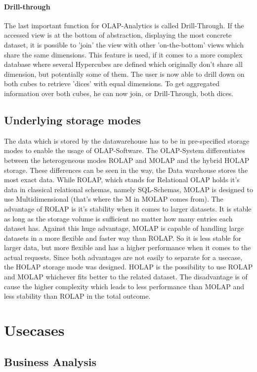 \documentclass[12pt,a4paper,oneside, 
liststotoc, 					%
bibtotoc,						%
titlepage, 						%
headsepline, 					%
BCOR6mm,						%
openany,							%
]{scrreprt}
\begin{document}
\subsubsection{Drill-through}\label{drill}
The last important function for OLAP-Analytics is called Drill-Through. If the accessed view is at the bottom of abstraction, displaying the most concrete dataset, it is possible to 'join' the view with other 'on-the-bottom' views which share the same dimensions. This feature is used, if it comes to a more complex database where several Hypercubes are defined which originally don't share all dimension, but potentially some of them. The user is now able to drill down on both cubes to retrieve 'dices' with equal dimensions. To get aggregated information over both cubes, he can now join, or Drill-Through, both dices.
\section{Underlying storage modes}
The data which is stored by the datawarehouse has to be in pre-specified storage modes to enable the usage of OLAP-Software. The OLAP-System differentiates between the heterogeneous modes ROLAP and MOLAP and the hybrid HOLAP storage. These differences can be seen in the way, the Data warehouse stores the most exact data. While ROLAP, which stands for Relational OLAP holds it's data in classical relational schemas, namely SQL-Schemas, MOLAP is designed to use Multidimensional (that's where the M in MOLAP comes from). The advantage of ROLAP is it's stability when it comes to larger datasets. It is stable as long as the storage volume is sufficient no matter how many entries each dataset has. Against this huge advantage, MOLAP is capable of handling large datasets in a more flexible and faster way than ROLAP. So it is less stable for larger data, but more flexible and has a higher performance when it comes to the actual requests.
Since both advantages are not easily to separate for a usecase, the HOLAP storage mode was designed. HOLAP is the possibility to use ROLAP and MOLAP whichever fits better to the related dataset. The disadvantage is of cause the higher complexity which leads to less performance than MOLAP and less stability than ROLAP in the total outcome.
\chapter{Usecases}\label{usecases}
\section{Business Analysis}\label{ba}
\end{document}
